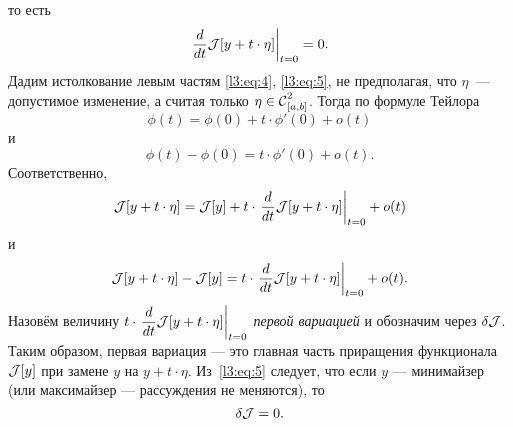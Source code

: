 то есть
\begin{equation}\label{l3:eq:5}
	\left.\der{}{t}\J[y+t\cdot\eta]\right|_{t=0}=0.
\end{equation}
Дадим истолкование левым частям \eqref{l3:eq:4}, \eqref{l3:eq:5}, не предполагая, что $\eta$~--- допустимое изменение, а считая только $\eta\in\Cfn[{[a,b]}]{2}$. Тогда по формуле Тейлора
\begin{equation*}
	\phi(t)=\phi(0)+t\cdot\phi'(0)+o(t)
\end{equation*}
и
\begin{equation*}
	\phi(t)-\phi(0)=t\cdot\phi'(0)+o(t).
\end{equation*}
Соответственно,
\begin{equation*}
	\J[y+t\cdot\eta]=\J[y]+t\cdot\left.\der{}{t}\J[y+t\cdot\eta]\right|_{t=0}+o(t)
\end{equation*}
и
\begin{equation*}
	\J[y+t\cdot\eta]-\J[y]=t\cdot\left.\der{}{t}\J[y+t\cdot\eta]\right|_{t=0}+o(t).
\end{equation*}
Назовём величину $t\cdot\left.\displaystyle\der{}{t}\J[y+t\cdot\eta]\right|_{t=0}$ \emph{первой вариацией} и обозначим через $\delta\J$. Таким образом{\mb,} первая вариация --- это главная часть приращения функционала $\J[y]$ при замене $y$ на $y+t\cdot\eta$. Из~\eqref{l3:eq:5} следует, что если $y$ --- минимайзер (или максимайзер --- рассуждения не меняются), то 
\begin{equation}
	\label{l3:eq:6}
	\delta\J=0.
\end{equation}

